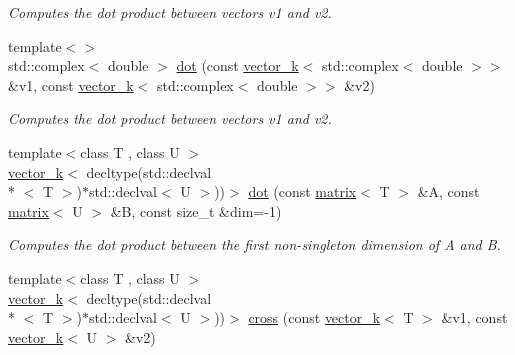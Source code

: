 \begin{DoxyCompactItemize}
\begin{DoxyCompactList}\small\item\em Computes the dot product between vectors v1 and v2. \end{DoxyCompactList}\item 
\hypertarget{namespacekeycpp_a3499b51e89dfda97b0dcf5dc2461926a}{{\footnotesize template$<$$>$ }\\std\-::complex$<$ double $>$ \hyperlink{namespacekeycpp_a3499b51e89dfda97b0dcf5dc2461926a}{dot} (const \hyperlink{classkeycpp_1_1vector__k}{vector\-\_\-k}$<$ std\-::complex$<$ double $>$$>$ \&v1, const \hyperlink{classkeycpp_1_1vector__k}{vector\-\_\-k}$<$ std\-::complex$<$ double $>$$>$ \&v2)}\label{namespacekeycpp_a3499b51e89dfda97b0dcf5dc2461926a}

\begin{DoxyCompactList}\small\item\em Computes the dot product between vectors v1 and v2. \end{DoxyCompactList}\item 
\hypertarget{namespacekeycpp_a0d4eac6fbefd72947d7fe26fada6c221}{{\footnotesize template$<$class T , class U $>$ }\\\hyperlink{classkeycpp_1_1vector__k}{vector\-\_\-k}$<$ decltype(std\-::declval\\*
$<$ T $>$)$\ast$std\-::declval$<$ U $>$))$>$ \hyperlink{namespacekeycpp_a0d4eac6fbefd72947d7fe26fada6c221}{dot} (const \hyperlink{classkeycpp_1_1matrix}{matrix}$<$ T $>$ \&A, const \hyperlink{classkeycpp_1_1matrix}{matrix}$<$ U $>$ \&B, const size\-\_\-t \&dim=-\/1)}\label{namespacekeycpp_a0d4eac6fbefd72947d7fe26fada6c221}

\begin{DoxyCompactList}\small\item\em Computes the dot product between the first non-\/singleton dimension of A and B. \end{DoxyCompactList}\item 
\hypertarget{namespacekeycpp_aa590a6946f71f4c1b2e575bdb791f00f}{{\footnotesize template$<$class T , class U $>$ }\\\hyperlink{classkeycpp_1_1vector__k}{vector\-\_\-k}$<$ decltype(std\-::declval\\*
$<$ T $>$)$\ast$std\-::declval$<$ U $>$))$>$ \hyperlink{namespacekeycpp_aa590a6946f71f4c1b2e575bdb791f00f}{cross} (const \hyperlink{classkeycpp_1_1vector__k}{vector\-\_\-k}$<$ T $>$ \&v1, const \hyperlink{classkeycpp_1_1vector__k}{vector\-\_\-k}$<$ U $>$ \&v2)}\label{namespacekeycpp_aa590a6946f71f4c1b2e575bdb791f00f}


\end{DoxyCompactItemize}
